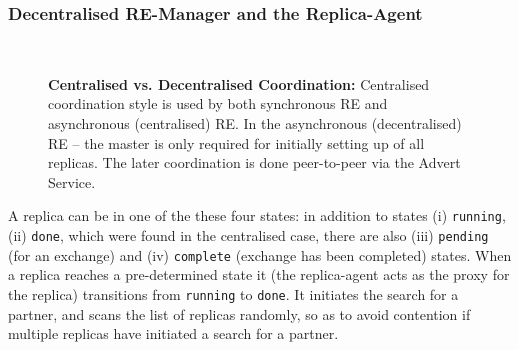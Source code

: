 \documentclass{rspublic}
\begin{document}
\subsubsection{Decentralised RE-Manager and the Replica-Agent}
\begin{figure}%
\centering
{}\qquad
{}\\
\caption{\textbf{Centralised vs. Decentralised Coordination:} 
  Centralised coordination style is used by both synchronous RE  and asynchronous (centralised) RE.  In the asynchronous (decentralised) RE --
  the master is only required for initially setting up of all
  replicas. The later coordination is done peer-to-peer via the Advert
  Service.}
\label{fig:coordination}
\end{figure}

 
A replica can be in one of the these four states: in addition to
states (i) \texttt{running}, (ii) \texttt{done}, which were found in
the centralised case, there are also (iii) \texttt{pending} (for an
exchange) and (iv) \texttt{complete} (exchange has been completed)
states.  When a replica reaches a pre-determined state it (the
replica-agent acts as the proxy for the replica) transitions from
\texttt{running} to \texttt{done}. It initiates the search for a
partner, and scans the list of replicas randomly, so as to avoid
contention if multiple replicas have initiated a search for a partner.
\end{document}
